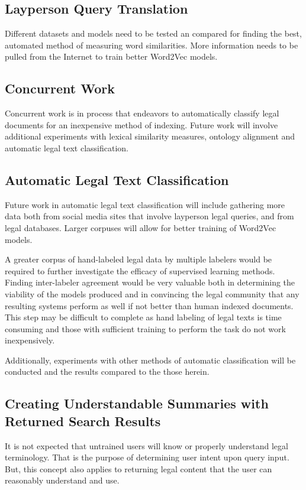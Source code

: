 \documentclass[11pt]{article}
\begin{document}
\subsection{Layperson Query Translation}
Different datasets and models need to be tested an compared for finding the best, automated method of measuring word similarities.  More information needs to be pulled from the Internet to train better Word2Vec models.   

\subsection{Concurrent Work}
Concurrent work is in process that endeavors to automatically classify legal documents for an inexpensive method of indexing.  Future work will involve additional experiments with lexical similarity measures, ontology alignment and automatic legal text classification.  

\subsection{Automatic Legal Text Classification}
Future work in automatic legal text classification will include gathering more data both from social media sites that involve layperson legal queries, and from legal databases.  Larger corpuses will allow for better training of Word2Vec models.

A greater corpus of hand-labeled legal data by multiple labelers would be required to further investigate the efficacy of supervised learning methods.  Finding inter-labeler agreement would be very valuable both in determining the viability of the models produced and in convincing the legal community that any resulting systems perform as well if not better than human indexed documents.  This step may be difficult to complete as hand labeling of legal texts is time consuming and those with sufficient training to perform the task do not work inexpensively.  

Additionally, experiments with other methods of automatic classification will be conducted and the results compared to the those herein.    

\subsection{Creating Understandable Summaries with Returned Search Results}
It is not expected that untrained users will know or properly understand legal terminology.  That is the purpose of determining user intent upon query input.  But, this concept also applies to returning legal content that the user can reasonably understand and use.  
\end{document}
